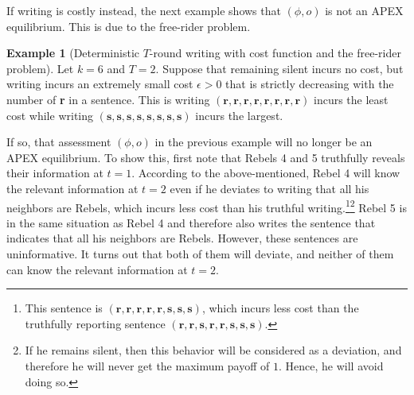\documentclass[12pt,letter]{article}
\newcommand\omicron{o}
\theoremstyle{definition}
\newtheorem{example}{Example}
\theoremstyle{remark}
\theoremstyle{claim}
\begin{document}
If writing is costly instead, the next example shows that $(\phi,\omicron)$ is not an APEX equilibrium. This is due to the free-rider problem.

\begin{example}[Deterministic $T$-round writing with cost function and the free-rider problem]
\label{ex:cost_function_talk_fr}
Let $k=6$ and $T=2$. Suppose that remaining silent incurs no cost, but writing incurs an extremely small cost $\epsilon>0$ that is strictly decreasing with the number of \textbf{r} in a sentence. This is writing $(\textbf{r},\textbf{r},\textbf{r},\textbf{r},\textbf{r},\textbf{r},\textbf{r},\textbf{r})$ incurs the least cost while writing $(\textbf{s},\textbf{s},\textbf{s},\textbf{s},\textbf{s},\textbf{s},\textbf{s},\textbf{s})$ incurs the largest. 

If so, that assessment $(\phi, \omicron)$ in the previous example will no longer be an APEX equilibrium. To show this, first note that Rebels 4 and 5 truthfully reveals their information at $t=1$. According to the above-mentioned, Rebel 4 will know the relevant information at $t=2$ even if he deviates to writing that all his neighbors are Rebels, which incurs less cost than his truthful writing.\footnote{This sentence is $(\textbf{r},\textbf{r},\textbf{r},\textbf{r},\textbf{r},\textbf{s},\textbf{s},\textbf{s})$, which incurs less cost than the truthfully reporting sentence $(\textbf{r},\textbf{r},\textbf{s},\textbf{r},\textbf{r},\textbf{s},\textbf{s},\textbf{s})$.}\footnote{If he remains silent, then this behavior will be considered as a deviation, and therefore he will never get the maximum payoff of $1$. Hence, he will avoid doing so.}
Rebel 5 is in the same situation as Rebel 4 and therefore also writes the sentence that indicates that all his neighbors are Rebels. However, these sentences are uninformative. It turns out that both of them will deviate, and neither of them can know the relevant information at $t=2$.


\end{example}
\end{document}
